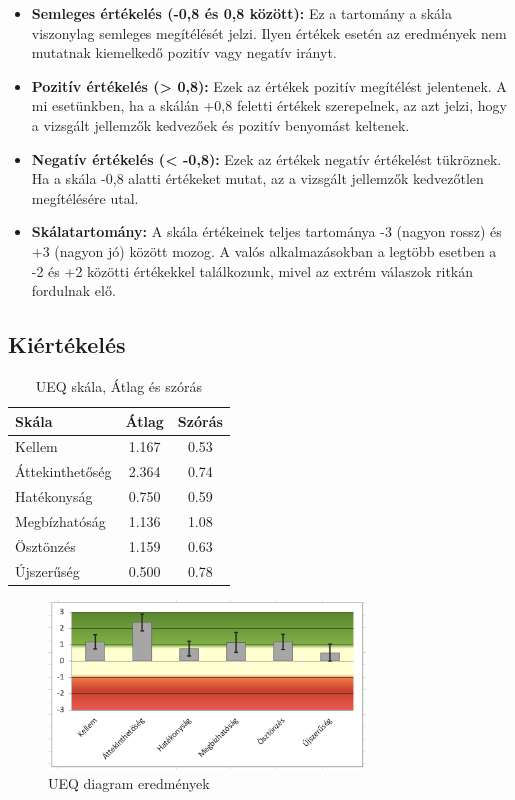 \begin{itemize}
    \item \textbf{Semleges értékelés (-0,8 és 0,8 között):} Ez a tartomány a skála viszonylag semleges megítélését jelzi. Ilyen értékek esetén az eredmények nem mutatnak kiemelkedő pozitív vagy negatív irányt.
    
    \item \textbf{Pozitív értékelés (> 0,8):} Ezek az értékek pozitív megítélést jelentenek. A mi esetünkben, ha a skálán +0,8 feletti értékek szerepelnek, az azt jelzi, hogy a vizsgált jellemzők kedvezőek és pozitív benyomást keltenek.
    
    \item \textbf{Negatív értékelés (< -0,8):} Ezek az értékek negatív értékelést tükröznek. Ha a skála -0,8 alatti értékeket mutat, az a vizsgált jellemzők kedvezőtlen megítélésére utal.
    
    \item \textbf{Skálatartomány:} A skála értékeinek teljes tartománya -3 (nagyon rossz) és +3 (nagyon jó) között mozog. A valós alkalmazásokban a legtöbb esetben a -2 és +2 közötti értékekkel találkozunk, mivel az extrém válaszok ritkán fordulnak elő.
\end{itemize}

\subsection{Kiértékelés}
\begin{table}[h]
    \centering
    \caption{UEQ skála, Átlag és szórás}
    \begin{tabular}{|l|c|c|}
        \hline
        \textbf{Skála} & \textbf{Átlag} & \textbf{Szórás} \\ \hline
        Kellem & 1.167 & 0.53 \\ \hline
        Áttekinthetőség & 2.364 & 0.74 \\ \hline
        Hatékonyság & 0.750 & 0.59 \\ \hline
        Megbízhatóság & 1.136 & 1.08 \\ \hline
        Ösztönzés & 1.159 & 0.63 \\ \hline
        Újszerűség & 0.500 & 0.78 \\ \hline
    \end{tabular}
    \label{tab:ueq_scales}
\end{table}

\begin{figure}[h]
    \center
    \includegraphics[width=0.75\textwidth]{img/UEQ_diagram.png}
    \caption{UEQ diagram eredmények}
    \label{diag:ueq}
\end{figure}

